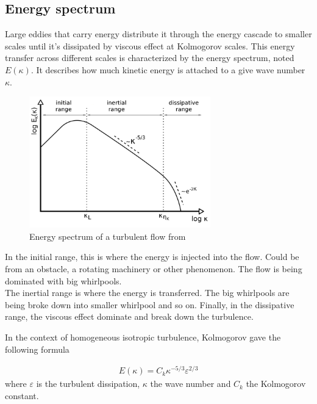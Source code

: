 \documentclass[a4paper,12pt]{article}
\theoremstyle{definition}
\begin{document}
\subsection{Energy spectrum}
Large eddies that carry energy distribute it through the energy cascade to smaller scales until it's dissipated by viscous effect at Kolmogorov scales. 
This energy transfer across different scales is characterized by the energy spectrum, noted $E(\kappa)$. It describes how much kinetic energy is attached to a give wave number $\kappa$. 
\begin{figure}[H]
    \centering
    \includegraphics[width=0.7\textwidth]{illustrations/energy-spectrum-example.png}
    \caption{Energy spectrum of a turbulent flow from \cite{phdthesisRies}}
\end{figure}

In the initial range, this is where the energy is injected into the flow. Could be from an obstacle, a rotating machinery or other phenomenon. The flow is being dominated with big whirlpools. \\
The inertial range is where the energy is transferred. The big whirlpools are being broke down into smaller whirlpool and so on.  Finally, in the dissipative range, the viscous effect dominate and break down the turbulence.

\bigskip

In the context of homogeneous isotropic turbulence, Kolmogorov gave the following formula  

\begin{align}
    E(\kappa) = C_k \kappa^{-5/3}\varepsilon^{2/3}
\end{align}
where $\varepsilon$ is the turbulent dissipation, $\kappa$ the wave number and $C_k$ the Kolmogorov constant.
\end{document}

